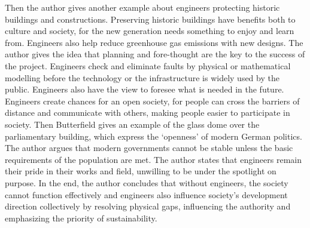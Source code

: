 \documentclass[12pt,a4]{article}
\begin{document}
Then the author gives another example about engineers protecting historic
buildings and constructions.
Preserving historic buildings have benefits both to culture and society, for the
new generation needs something to enjoy and learn from.
Engineers also help reduce greenhouse gas emissions with new designs.
%
%
The author gives the idea that planning and fore-thought are the key to the
success of the project.
Engineers check and eliminate faults by physical or mathematical modelling
before the technology or the infrastructure is widely used by the public.
Engineers also have the view to foresee what is needed in the future.
%
%
Engineers create chances for an open society, for people can cross the
barriers of distance and communicate with others, making people easier to
participate in society.
Then Butterfield gives an example of the glass dome over the parliamentary
building, which express the `openness' of modern German politics.
The author argues that modern governments cannot be stable unless the basic
requirements of the population are met.
%
The author states that engineers remain their pride in their works and field,
unwilling to be under the spotlight on purpose.
%
In the end, the author concludes that without engineers, the society cannot
function effectively and engineers also influence society's development
direction collectively by resolving physical gaps, influencing the authority and
emphasizing the priority of sustainability.  
%
%

\newpage


\end{document}

